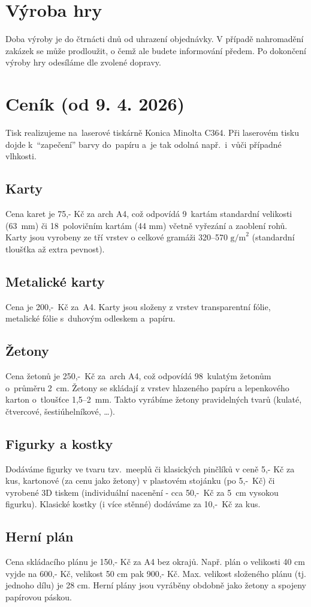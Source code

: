 \documentclass[14pt,a4paper]{extarticle}
\begin{document}
\section{Výroba hry}
Doba výroby je do čtrnácti dnů od uhrazení objednávky. V případě nahromadění zakázek se může prodloužit, o čemž ale budete informování předem. Po dokončení výroby hry odesíláme dle zvolené dopravy.

\section*{Ceník \textnormal{(od 9. 4. 2026)}}
Tisk realizujeme na~laserové tiskárně Konica Minolta C364. Při laserovém tisku dojde k~\enquote{zapečení} barvy do~papíru a~je tak odolná např.~i~vůči případné vlhkosti.

\subsection*{Karty}
Cena karet je 75,- Kč za arch A4, což odpovídá 9~kartám standardní velikosti (63~mm) či 18~polovičním kartám (44 mm) včetně vyřezání a zaoblení rohů. Karty jsou vyrobeny ze tří vrstev o celkové gramáži 320--570 $\text{g/m}^2$ (standardní tloušťka až extra pevnost). 
\subsection*{Metalické karty}
Cena je 200,-~Kč za~A4. Karty jsou složeny z vrstev transparentní fólie, metalické fólie s~duhovým odleskem a~papíru. 
\subsection*{Žetony}
Cena žetonů je 250,-~Kč za~arch A4, což odpovídá 98~kulatým žetonům o~průměru 2~cm. Žetony se skládají z vrstev hlazeného papíru a lepenkového karton o~tloušťce 1,5--2~mm. Takto vyrábíme žetony pravidelných tvarů (kulaté, čtvercové, šestiúhelníkové, …).
\subsection*{Figurky a kostky}
Dodáváme figurky ve tvaru tzv.~meeplů či klasických pinčlíků v ceně 5,- Kč za kus, kartonové (za cenu jako žetony) v plastovém stojánku (po 5,-~Kč) či vyrobené 3D tiskem (individuální nacenění - cca 50,-~Kč za 5~cm vysokou figurku). Klasické kostky (i více stěnné) dodáváme za 10,-~Kč za kus.
\subsection*{Herní plán}
Cena skládacího plánu je 150,- Kč za A4 bez okrajů. Např. plán o velikosti 40 cm vyjde na 600,- Kč, velikost 50 cm pak 900,- Kč. Max. velikost složeného plánu (tj. jednoho dílu) je 28 cm. Herní plány jsou vyráběny obdobně jako žetony a spojeny papírovou páskou.
\end{document}
